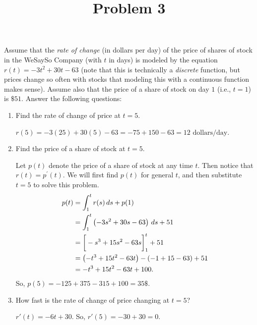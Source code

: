 \documentclass{ximera}
\title[Problem 3]{Problem 3}
\begin{document}
\begin{abstract} \end{abstract}
\maketitle


\begin{problem}
	Assume that the {\it rate of change} (in dollars per day) of the price of shares of stock
	in the WeSaySo Company (with $t$ in days) is modeled by the equation $r(t) = -3t^2+30t-63$
	(note that this is technically a {\it discrete} function, but prices change so often with stocks that modeling this with a continuous function makes sense).
	Assume also that the price of a share of stock on day $1$ (i.e., $t=1$) is $\$51$.
	Answer the following questions:
	\begin{enumerate}

	\item  Find the rate of change of price at $t=5$.
		\begin{explanation}
			$r(5) = -3(25) + 30(5) - 63 = -75+150-63=12 \text{ dollars/day}$.
		\end{explanation}




	\item  Find the price of a share of stock at $t=5$.
		\begin{explanation}
			Let $p(t)$ denote the price of a share of stock at any time $t$.
			Then notice that $r(t) = p^\prime (t)$.
			We will first find $p(t)$ for general $t$, and then substitute $t=5$ to solve this problem.
			\begin{align*}
				p(t) &= \displaystyle \int_1^t r(s) \,d s + p(1)  \\
					&= \displaystyle \int_1^t \left( -3s^2 + 30s - 63 \right) \,d s + 51  \\
					&= \bigg[  - s^3 + 15s^2 - 63s \bigg]_1^t + 51  \\
					&= \left( - t^3 + 15t^2 - 63t \right) - (-1+15-63) + 51  \\
				&= -t^3 + 15t^2 - 63t + 100.
			\end{align*}
			So, $p(5) = -125+375-315+100=35\$.$
		\end{explanation}




	\item  How fast is the rate of change of price changing at $t=5$?
		\begin{explanation}
			$r'(t) = -6t + 30$.  So, $r'(5) = -30+30=0$.
		\end{explanation}


\end{enumerate}
\end{problem}
\end{document}

